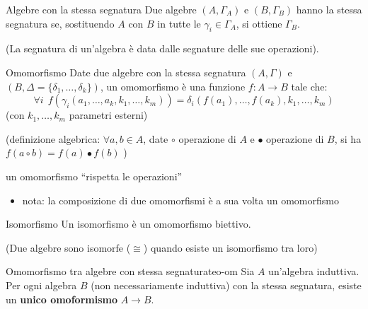 \documentclass[a4paper,11pt]{report}
\begin{document}
\begin{defbox}{Algebre con la stessa segnatura}{}
    Due algebre \( (A, \Gamma_A) \) e \( (B, \Gamma_B) \) hanno la stessa segnatura se, sostituendo \( A \) con \( B \) in tutte le \( \gamma_i \in \Gamma_A \), si ottiene \( \Gamma_B \).

    (La segnatura di un'algebra è data dalle segnature delle sue operazioni).
\end{defbox}

\begin{defbox}{Omomorfismo}{}
    Date due algebre con la stessa segnatura \( (A, \Gamma) \) e \( (B, \Delta = \{\delta_1, \dots, \delta_k\} ) \), un omomorfismo è una funzione \( f: A \to B \) tale che:
    \[ \forall i \ \ f(\gamma_i (a_1, \dots, a_k, k_1, \dots, k_m)) = \delta_i (f(a_1), \dots, f(a_k), k_1, \dots, k_m)\]
    {\small(con \( k_1, \dots, k_m \) parametri esterni)}

    \vspace{0.5em}

    (definizione algebrica: \( \forall a, b \in A \), date \(\circ\) operazione di \( A \) e \(\bullet\) operazione di \( B \), si ha \( f(a \circ b) = f(a) \bullet f(b) \) )
    \vspace{0.5em}

    {\small \color{gray} un omomorfismo ``rispetta le operazioni''}

    \begin{itemize}
        \item nota: la composizione di due omomorfismi è a sua volta un omomorfismo
    \end{itemize}
\end{defbox}

\begin{defbox}{Isomorfismo}{}
    Un isomorfismo è un omomorfismo biettivo.

    (Due algebre sono isomorfe (\( \cong \)) quando esiste un isomorfismo tra loro)
\end{defbox}

\begin{thmbox}{Omomorfismo tra algebre con stessa segnatura}{teo-om}
    Sia \( A \) un'algebra induttiva. Per ogni algebra \( B \) (non necessariamente induttiva) con la stessa segnatura, esiste un \textbf{unico omoformismo} \( A \to B \).

\end{thmbox}
\end{document}
